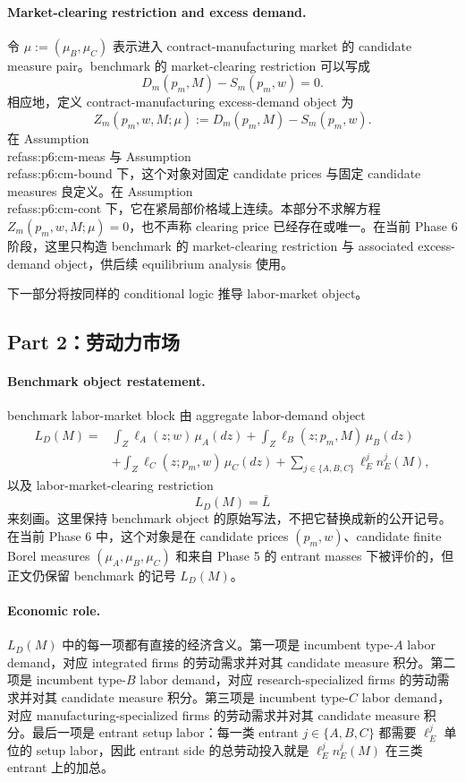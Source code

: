 \paragraph{Market-clearing restriction and excess demand.}
令 $\mu:=(\mu_B,\mu_C)$ 表示进入 contract-manufacturing market 的 candidate measure pair。benchmark 的 market-clearing restriction 可以写成
\[
D_m(p_m,M)-S_m(p_m,w)=0.
\]
相应地，定义 contract-manufacturing excess-demand object 为
\[
Z_m(p_m,w,M;\mu):=D_m(p_m,M)-S_m(p_m,w).
\]
在 Assumption~\\ref{ass:p6:cm-meas} 与 Assumption~\\ref{ass:p6:cm-bound} 下，这个对象对固定 candidate prices 与固定 candidate measures 良定义。在 Assumption~\\ref{ass:p6:cm-cont} 下，它在紧局部价格域上连续。本部分不求解方程 $Z_m(p_m,w,M;\mu)=0$，也不声称 clearing price 已经存在或唯一。在当前 Phase 6 阶段，这里只构造 benchmark 的 market-clearing restriction 与 associated excess-demand object，供后续 equilibrium analysis 使用。

下一部分将按同样的 conditional logic 推导 labor-market object。

\subsection{Part 2：劳动力市场}

\paragraph{Benchmark object restatement.}
benchmark labor-market block 由 aggregate labor-demand object
\[
\begin{aligned}
L_D(M)={}&\int_Z \ell_A(z;w)\,\mu_A(dz)
+\int_Z \ell_B(z;p_m,M)\,\mu_B(dz)\\
&+\int_Z \ell_C(z;p_m,w)\,\mu_C(dz)
+\sum_{j\in\{A,B,C\}}\ell_E^j n_E^j(M),
\end{aligned}
\]
以及 labor-market-clearing restriction
\[
L_D(M)=\bar L
\]
来刻画。这里保持 benchmark object 的原始写法，不把它替换成新的公开记号。在当前 Phase 6 中，这个对象是在 candidate prices $(p_m,w)$、candidate finite Borel measures $(\mu_A,\mu_B,\mu_C)$ 和来自 Phase 5 的 entrant masses 下被评价的，但正文仍保留 benchmark 的记号 $L_D(M)$。

\paragraph{Economic role.}
$L_D(M)$ 中的每一项都有直接的经济含义。第一项是 incumbent type-$A$ labor demand，对应 integrated firms 的劳动需求并对其 candidate measure 积分。第二项是 incumbent type-$B$ labor demand，对应 research-specialized firms 的劳动需求并对其 candidate measure 积分。第三项是 incumbent type-$C$ labor demand，对应 manufacturing-specialized firms 的劳动需求并对其 candidate measure 积分。最后一项是 entrant setup labor：每一类 entrant $j\in\{A,B,C\}$ 都需要 $\ell_E^j$ 单位的 setup labor，因此 entrant side 的总劳动投入就是 $\ell_E^j n_E^j(M)$ 在三类 entrant 上的加总。

